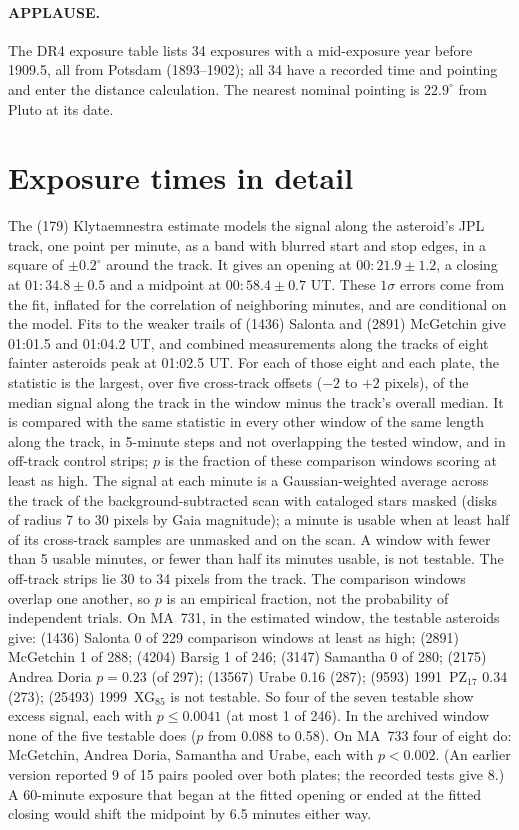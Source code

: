 \documentclass[11pt]{article}
\begin{document}
\begin{appendices}
\paragraph{APPLAUSE.} The DR4 exposure table lists 34 exposures with a mid-exposure year before 1909.5, all from Potsdam (1893--1902); all 34 have a recorded time and pointing and enter the distance calculation. The nearest nominal pointing is $22.9^\circ$ from Pluto at its date.

\section{Exposure times in detail}
\label{app:clock}

The (179) Klytaemnestra estimate models the signal along the asteroid's JPL track, one point per minute, as a band with blurred start and stop edges, in a square of $\pm0.2^\circ$ around the track. It gives an opening at $00{:}21.9\pm1.2$, a closing at $01{:}34.8\pm0.5$ and a midpoint at $00{:}58.4\pm0.7$ UT. These $1\sigma$ errors come from the fit, inflated for the correlation of neighboring minutes, and are conditional on the model. Fits to the weaker trails of (1436) Salonta and (2891) McGetchin give 01:01.5 and 01:04.2 UT, and combined measurements along the tracks of eight fainter asteroids peak at 01:02.5 UT. For each of those eight and each plate, the statistic is the largest, over five cross-track offsets ($-2$ to $+2$ pixels), of the median signal along the track in the window minus the track's overall median. It is compared with the same statistic in every other window of the same length along the track, in 5-minute steps and not overlapping the tested window, and in off-track control strips; $p$ is the fraction of these comparison windows scoring at least as high. The signal at each minute is a Gaussian-weighted average across the track of the background-subtracted scan with cataloged stars masked (disks of radius 7 to 30 pixels by Gaia magnitude); a minute is usable when at least half of its cross-track samples are unmasked and on the scan. A window with fewer than 5 usable minutes, or fewer than half its minutes usable, is not testable. The off-track strips lie 30 to 34 pixels from the track. The comparison windows overlap one another, so $p$ is an empirical fraction, not the probability of independent trials. On MA~731, in the estimated window, the testable asteroids give: (1436) Salonta 0 of 229 comparison windows at least as high; (2891) McGetchin 1 of 288; (4204) Barsig 1 of 246; (3147) Samantha 0 of 280; (2175) Andrea Doria $p=0.23$ (of 297); (13567) Urabe 0.16 (287); (9593) 1991~PZ$_{17}$ 0.34 (273); (25493) 1999~XG$_{85}$ is not testable. So four of the seven testable show excess signal, each with $p\le0.0041$ (at most 1 of 246). In the archived window none of the five testable does ($p$ from 0.088 to 0.58). On MA~733 four of eight do: McGetchin, Andrea Doria, Samantha and Urabe, each with $p<0.002$. (An earlier version reported 9 of 15 pairs pooled over both plates; the recorded tests give 8.) A 60-minute exposure that began at the fitted opening or ended at the fitted closing would shift the midpoint by 6.5 minutes either way.


\end{appendices}
\end{document}
